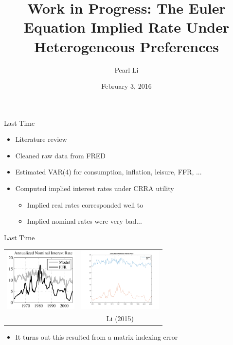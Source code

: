 \documentclass{beamer}
\title[Euler Equation]{Work in Progress: The Euler Equation Implied Rate Under Heterogeneous Preferences}
\author[Li]{Pearl Li}
\date{February 3, 2016}
\begin{document}
\begin{frame}
\titlepage
\end{frame}


\begin{frame}{Last Time}
\begin{itemize}
\item Literature review
\item Cleaned raw data from FRED
\item Estimated VAR(4) for consumption, inflation, leisure, FFR, ...
\item Computed implied interest rates under CRRA utility
  \begin{itemize}
  \item Implied real rates corresponded well to \cite{collard11}
  \item Implied nominal rates were very bad...
  \end{itemize}
\end{itemize}
\end{frame}

\begin{frame}{Last Time}
\begin{center}
\begin{tabular}{cc}
\includegraphics[height=120px]{figs/old/crra-nominal_collard.png} &
\includegraphics[height=120px]{figs/old/crra-nominal.png} \\
\cite{collard11} & Li (2015)
\end{tabular}
\end{center}
\begin{itemize}
\item It turns out this resulted from a matrix indexing error
\end{itemize}
\end{frame}
\end{document}
